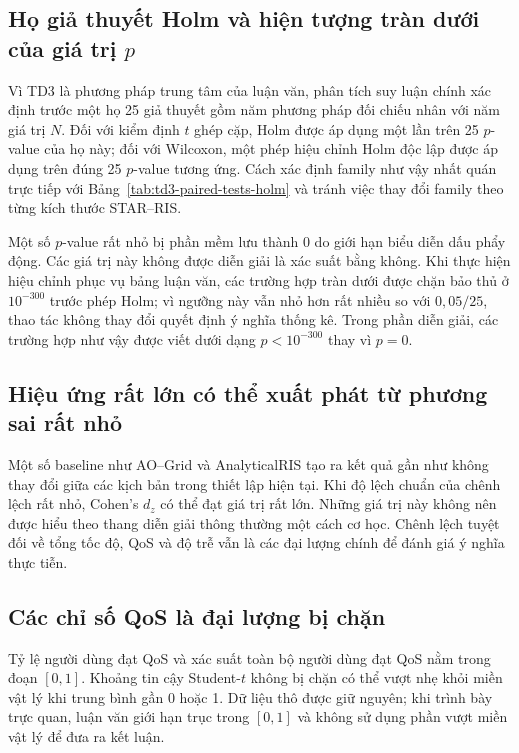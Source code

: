 \subsection{Họ giả thuyết Holm và hiện tượng tràn dưới của giá trị $p$}

Vì TD3 là phương pháp trung tâm của luận văn, phân tích suy luận chính xác định trước một họ 25 giả thuyết gồm năm phương pháp đối chiếu nhân với năm giá trị $N$. Đối với kiểm định $t$ ghép cặp, Holm được áp dụng một lần trên 25 $p$-value của họ này; đối với Wilcoxon, một phép hiệu chỉnh Holm độc lập được áp dụng trên đúng 25 $p$-value tương ứng. Cách xác định family như vậy nhất quán trực tiếp với Bảng~\ref{tab:td3-paired-tests-holm} và tránh việc thay đổi family theo từng kích thước STAR--RIS.

Một số $p$-value rất nhỏ bị phần mềm lưu thành 0 do giới hạn biểu diễn dấu phẩy động. Các giá trị này không được diễn giải là xác suất bằng không. Khi thực hiện hiệu chỉnh phục vụ bảng luận văn, các trường hợp tràn dưới được chặn bảo thủ ở $10^{-300}$ trước phép Holm; vì ngưỡng này vẫn nhỏ hơn rất nhiều so với $0{,}05/25$, thao tác không thay đổi quyết định ý nghĩa thống kê. Trong phần diễn giải, các trường hợp như vậy được viết dưới dạng $p<10^{-300}$ thay vì $p=0$.

\subsection{Hiệu ứng rất lớn có thể xuất phát từ phương sai rất nhỏ}

Một số baseline như AO--Grid và AnalyticalRIS tạo ra kết quả gần như không thay đổi giữa các kịch bản trong thiết lập hiện tại. Khi độ lệch chuẩn của chênh lệch rất nhỏ, Cohen's $d_z$ có thể đạt giá trị rất lớn. Những giá trị này không nên được hiểu theo thang diễn giải thông thường một cách cơ học. Chênh lệch tuyệt đối về tổng tốc độ, QoS và độ trễ vẫn là các đại lượng chính để đánh giá ý nghĩa thực tiễn.

\subsection{Các chỉ số QoS là đại lượng bị chặn}

Tỷ lệ người dùng đạt QoS và xác suất toàn bộ người dùng đạt QoS nằm trong đoạn $[0,1]$. Khoảng tin cậy Student-$t$ không bị chặn có thể vượt nhẹ khỏi miền vật lý khi trung bình gần 0 hoặc 1. Dữ liệu thô được giữ nguyên; khi trình bày trực quan, luận văn giới hạn trục trong $[0,1]$ và không sử dụng phần vượt miền vật lý để đưa ra kết luận.

